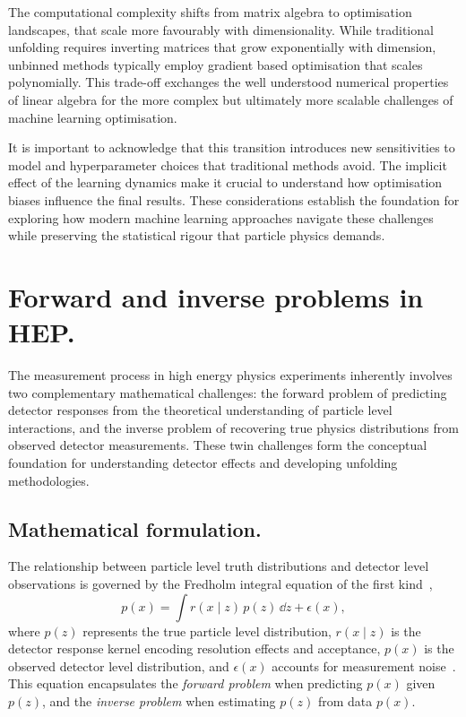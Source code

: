         The computational complexity shifts from matrix algebra to optimisation landscapes, that scale more favourably with dimensionality.
        While traditional unfolding requires inverting matrices that grow exponentially with dimension, unbinned methods typically employ gradient based optimisation that scales polynomially.
        This trade-off exchanges the well understood numerical properties of linear algebra for the more complex but ultimately more scalable challenges of machine learning optimisation.

        It is important to acknowledge that this transition introduces new sensitivities to model and hyperparameter choices that traditional methods avoid.
        The implicit effect of the learning dynamics make it crucial to understand how optimisation biases influence the final results.
        These considerations establish the foundation for exploring how modern machine learning approaches navigate these challenges while preserving the statistical rigour that particle physics demands.

\section{Forward and inverse problems in HEP.}
\sectionminitoc
    The measurement process in high energy physics experiments inherently involves two complementary mathematical challenges: the forward problem of predicting detector responses from the theoretical understanding of particle level interactions, and the inverse problem of recovering true physics distributions from observed detector measurements.
    These twin challenges form the conceptual foundation for understanding detector effects and developing unfolding methodologies.

\subsection{Mathematical formulation.}

The relationship between particle level truth distributions and detector level observations is governed by the Fredholm integral equation of the first kind~\cite{fredholm_sur_1903},
%
\begin{equation}
    p(x) = \int r(x\mid z)\,p(z) \, \dd z + \epsilon(x),
\end{equation}
where \(p(z)\) represents the true particle level distribution, \(r(x\mid z)\) is the detector response kernel encoding resolution effects and acceptance, \(p(x)\) is the observed detector level distribution, and \(\epsilon(x)\) accounts for measurement noise~\cite{weinberg_elementary_1963}.
%
This equation encapsulates the \emph{forward problem} when predicting \(p(x)\) given \(p(z)\), and the \textit{inverse problem} when estimating \(p(z)\) from data \(p(x)\).

